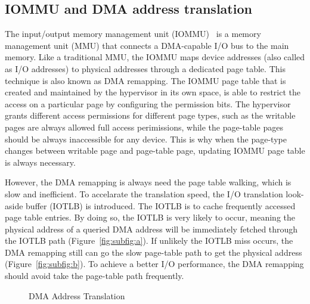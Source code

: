 \subsection{IOMMU and DMA address translation}
The input/output memory management unit (IOMMU)~\cite{directio} is a memory management unit (MMU) that connects a DMA-capable I/O bus to the main memory. 
Like a traditional MMU, the IOMMU maps device addresses (also called as I/O addresses) to physical addresses through a dedicated page table.
This technique is also known as DMA remapping.
The IOMMU page table that is created and maintained by the hypervisor in its own space, is able to restrict the access on a particular page by configuring the permission bits.
The hypervisor grants different access permissions for different page types, such as the writable pages are always allowed full access perimissions, while the page-table pages should be always inaccessible for any device.
This is why when the page-type changes between writable page and page-table page, updating IOMMU page table is always necessary.

However, the DMA remapping is always need the page table walking, which is slow and inefficient. 
To accelarate the translation speed, the I/O translation look-aside buffer (IOTLB) is introduced. 
The IOTLB is to cache frequently accessed page table entries. 
By doing so, the IOTLB is very likely to occur, meaning the physical address of a queried DMA address will be immediately fetched through the IOTLB path (Figure~\ref{fig:subfig:a}).
If unlikely the IOTLB miss occurs, the DMA remapping still can go the slow page-table path to get the physical address (Figure~\ref{fig:subfig:b}). 
To achieve a better I/O performance, the DMA remapping should avoid take the page-table path frequently.

\begin{figure}
\centering
{}
\hspace{1in}
\caption{DMA Address Translation}
\label{fig:dma-add-trans} %
\end{figure}

